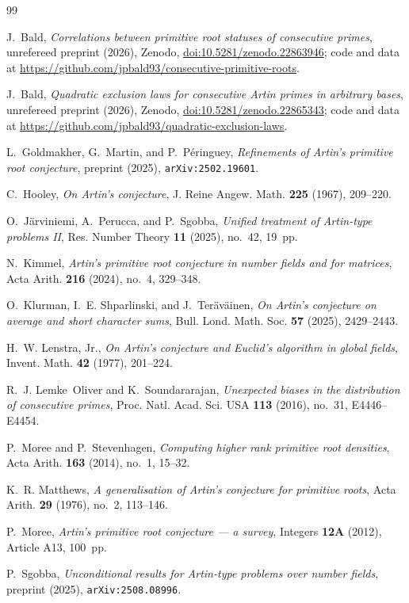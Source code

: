 \documentclass[11pt,reqno]{amsart}
\theoremstyle{plain}
\theoremstyle{definition}
\begin{document}
\begin{thebibliography}{99}

J.~Bald,
\emph{Correlations between primitive root statuses of consecutive primes},
unrefereed preprint (2026), Zenodo,
\href{https://doi.org/10.5281/zenodo.22863946}{doi:10.5281/zenodo.22863946};
code and data at
\url{https://github.com/jpbald93/consecutive-primitive-roots}.

 J.~Bald, \emph{Quadratic exclusion laws for consecutive Artin primes in arbitrary bases}, unrefereed preprint (2026), Zenodo, \href{https://doi.org/10.5281/zenodo.22865343}{doi:10.5281/zenodo.22865343}; code and data at \url{https://github.com/jpbald93/quadratic-exclusion-laws}.

L.~Goldmakher, G.~Martin, and P.~P\'eringuey,
\emph{Refinements of Artin's primitive root conjecture},
preprint (2025), \texttt{arXiv:2502.19601}.

C.~Hooley,
\emph{On Artin's conjecture},
J. Reine Angew. Math. \textbf{225} (1967), 209--220.

O.~J\"arviniemi, A.~Perucca, and P.~Sgobba,
\emph{Unified treatment of Artin-type problems II},
Res. Number Theory \textbf{11} (2025), no.~42, 19~pp.

N.~Kimmel,
\emph{Artin's primitive root conjecture in number fields and for matrices},
Acta Arith. \textbf{216} (2024), no.~4, 329--348.

O.~Klurman, I.~E. Shparlinski, and J.~Ter\"av\"ainen,
\emph{On Artin's conjecture on average and short character sums},
Bull. Lond. Math. Soc. \textbf{57} (2025), 2429--2443.

H.~W. Lenstra, Jr.,
\emph{On Artin's conjecture and Euclid's algorithm in global fields},
Invent. Math. \textbf{42} (1977), 201--224.

R.~J. Lemke~Oliver and K.~Soundararajan,
\emph{Unexpected biases in the distribution of consecutive primes},
Proc. Natl. Acad. Sci. USA \textbf{113} (2016), no.~31, E4446--E4454.

P.~Moree and P.~Stevenhagen,
\emph{Computing higher rank primitive root densities},
Acta Arith. \textbf{163} (2014), no.~1, 15--32.

K.~R. Matthews,
\emph{A generalisation of Artin's conjecture for primitive roots},
Acta Arith. \textbf{29} (1976), no.~2, 113--146.

P.~Moree,
\emph{Artin's primitive root conjecture --- a survey},
Integers \textbf{12A} (2012), Article A13, 100~pp.

P.~Sgobba,
\emph{Unconditional results for Artin-type problems over number fields},
preprint (2025), \texttt{arXiv:2508.08996}.

\end{thebibliography}
\end{document}
